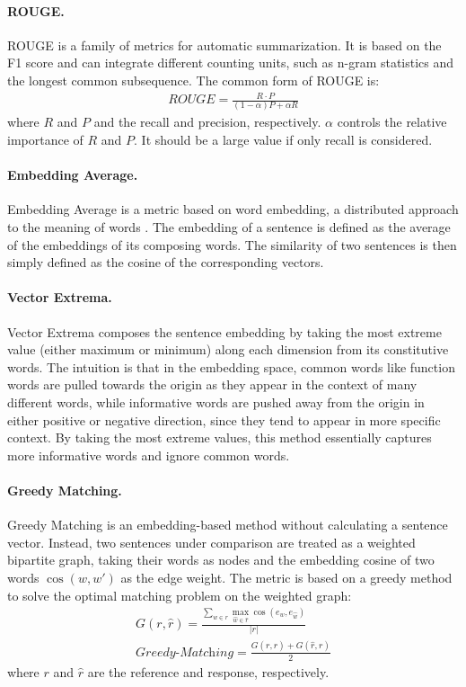 \documentclass[runningheads]{llncs}
\begin{document}
    \paragraph{ROUGE.}
    ROUGE \cite{ROUGE} is a family of metrics for automatic summarization. It is based on the F1 score and can integrate different counting units, such as n-gram statistics and the longest common subsequence. The common form of ROUGE is:
    \begin{align}
        \textit{ROUGE} = \frac{
        R \cdot P
        }{(1 - \alpha) P + \alpha R}
    \end{align}
    where $R$ and $P$ and the recall and precision, respectively. $\alpha$ controls the relative importance of $R$ and $P$. It should be a large value if only recall is considered.

    \paragraph{Embedding Average.}
    Embedding Average is a metric based on word embedding, a distributed approach to the meaning of words \cite{word2vec}. The embedding of a sentence is defined as the average of the embeddings of its composing words. The similarity of two sentences is then simply defined as the cosine of the corresponding vectors.

    \paragraph{Vector Extrema.}
    Vector Extrema \cite{Vector_Extrema} composes the sentence embedding by taking the most extreme value (either maximum or minimum) along each dimension from its constitutive words. The intuition is that in the embedding space, common words like function words are pulled towards the origin as they appear in the context of many different words, while informative words are pushed away from the origin in either positive or negative direction, since they tend to appear in more specific context. By taking the most extreme values, this method essentially captures more informative words and ignore common words.

    \paragraph{Greedy Matching.}
    Greedy Matching \cite{GreedyAndOptimal} is an embedding-based method without calculating a sentence vector. Instead, two sentences under comparison are treated as a weighted bipartite graph, taking their words as nodes and the embedding cosine of two words $\cos(w, w')$ as the edge weight. The metric is based on a greedy method to solve the optimal matching problem on the weighted graph:
    \begin{align}
        G(r, \hat{r}) = \frac{
        \sum_{w \in r} \max_{\hat{w} \in \hat{r}} \cos(e_w, e_{\hat{w}})
        }{ |r| } \\
        \textit{Greedy-Matching} = \frac{
        G(r, \hat{r}) + G(\hat{r}, r)
        }{2}
    \end{align}
    where $r$ and $\hat{r}$ are the reference and response, respectively.
\end{document}
